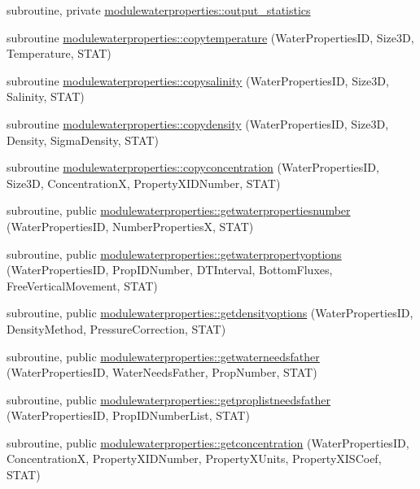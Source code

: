 \begin{DoxyCompactItemize}
\item 
subroutine, private \mbox{\hyperlink{namespacemodulewaterproperties_ae4782724563831422008fbeb12c51841}{modulewaterproperties\+::output\+\_\+statistics}}
\item 
subroutine \mbox{\hyperlink{namespacemodulewaterproperties_a6c8ccf3bc2c3f4cc47ee4ebfd2a2b354}{modulewaterproperties\+::copytemperature}} (Water\+Properties\+ID, Size3D, Temperature, S\+T\+AT)
\item 
subroutine \mbox{\hyperlink{namespacemodulewaterproperties_afb6f9f66ff7f1eabafe85dfdf9ddeca8}{modulewaterproperties\+::copysalinity}} (Water\+Properties\+ID, Size3D, Salinity, S\+T\+AT)
\item 
subroutine \mbox{\hyperlink{namespacemodulewaterproperties_a71b237b2c78cd159d5fc9be5a1a5f127}{modulewaterproperties\+::copydensity}} (Water\+Properties\+ID, Size3D, Density, Sigma\+Density, S\+T\+AT)
\item 
subroutine \mbox{\hyperlink{namespacemodulewaterproperties_ab01a5978241b2f90c9951fe60f6f7f8a}{modulewaterproperties\+::copyconcentration}} (Water\+Properties\+ID, Size3D, ConcentrationX, Property\+X\+I\+D\+Number, S\+T\+AT)
\item 
subroutine, public \mbox{\hyperlink{namespacemodulewaterproperties_a6e98b7d8e639a6feac4f88974d90c5e5}{modulewaterproperties\+::getwaterpropertiesnumber}} (Water\+Properties\+ID, Number\+PropertiesX, S\+T\+AT)
\item 
subroutine, public \mbox{\hyperlink{namespacemodulewaterproperties_aab0b283f67aa51240519cab03610aab7}{modulewaterproperties\+::getwaterpropertyoptions}} (Water\+Properties\+ID, Prop\+I\+D\+Number, D\+T\+Interval, Bottom\+Fluxes, Free\+Vertical\+Movement, S\+T\+AT)
\item 
subroutine, public \mbox{\hyperlink{namespacemodulewaterproperties_ac9026fc793014229d0d9bed57148db6a}{modulewaterproperties\+::getdensityoptions}} (Water\+Properties\+ID, Density\+Method, Pressure\+Correction, S\+T\+AT)
\item 
subroutine, public \mbox{\hyperlink{namespacemodulewaterproperties_a97df80c3a8c997c208dac464d58c0f8c}{modulewaterproperties\+::getwaterneedsfather}} (Water\+Properties\+ID, Water\+Needs\+Father, Prop\+Number, S\+T\+AT)
\item 
subroutine, public \mbox{\hyperlink{namespacemodulewaterproperties_ac8bf28f0c63fb495a5f90cf0d6563ae6}{modulewaterproperties\+::getproplistneedsfather}} (Water\+Properties\+ID, Prop\+I\+D\+Number\+List, S\+T\+AT)
\item 
subroutine, public \mbox{\hyperlink{namespacemodulewaterproperties_a45cbba90a6054db2070c49281da1ef56}{modulewaterproperties\+::getconcentration}} (Water\+Properties\+ID, ConcentrationX, Property\+X\+I\+D\+Number, Property\+X\+Units, Property\+X\+I\+S\+Coef, S\+T\+AT)

\end{DoxyCompactItemize}
